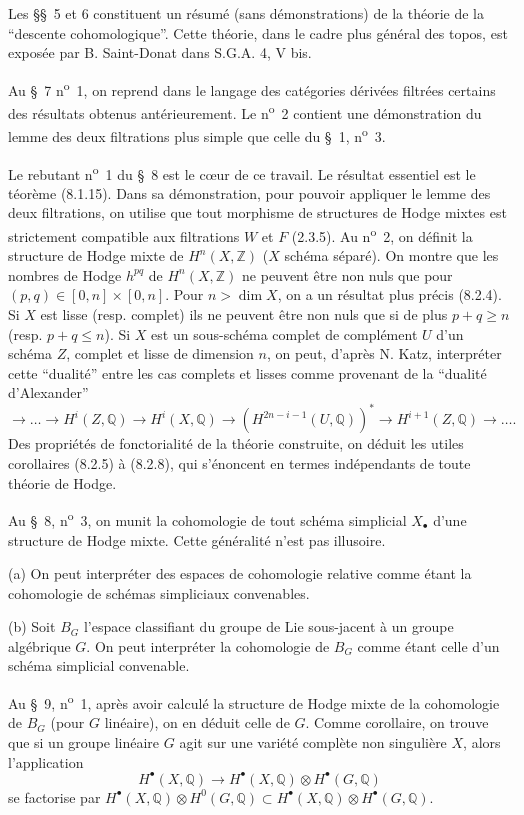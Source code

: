 \documentclass[11pt]{amsart}
\theoremstyle{plain}
\theoremstyle{definition}
\newcommand{\QQ}{\mathbb{Q}}
\newcommand{\ZZ}{\mathbb{Z}}
\begin{document}
Les \S\S\ 5 et 6 constituent un r\'esum\'e (sans d\'emonstrations) de la th\'eorie de la
``descente cohomologique''. Cette th\'eorie, dans le cadre plus g\'en\'eral des topos, est
expos\'ee par B. Saint-Donat dans S.G.A. 4, V bis.

Au \S\ 7 n\textsuperscript{o}\ 1, on reprend dans le langage des cat\'egories d\'eriv\'ees filtr\'ees certains
des r\'esultats obtenus ant\'erieurement. Le n\textsuperscript{o}\ 2 contient une d\'emonstration du lemme
des deux filtrations plus simple que celle du \S\ 1, n\textsuperscript{o}\ 3.

Le rebutant n\textsuperscript{o}\ 1 du \S\ 8 est le c\oe ur de ce travail. Le r\'esultat essentiel est le
t\'eor\`eme (8.1.15). Dans sa d\'emonstration, pour pouvoir appliquer le lemme des deux
filtrations, on utilise que tout morphisme de structures de Hodge mixtes est strictement
compatible aux filtrations $W$ et $F$ (2.3.5). Au n\textsuperscript{o}\ 2, on d\'efinit la structure de Hodge
mixte de $H^n(X, \ZZ)$ ($X$ sch\'ema s\'epar\'e). On montre que les nombres de Hodge $h^{pq}$ de
$H^n(X, \ZZ)$ ne peuvent \^etre non nuls que pour $(p,q) \in [0,n] \times [0,n]$. Pour $n > \dim X$,
on a un r\'esultat plus pr\'ecis (8.2.4). Si $X$ est lisse (resp. complet) ils ne peuvent \^etre
non nuls que si de plus $p+q \geq n$ (resp. $p+q \leq n$). Si $X$ est un sous-sch\'ema complet de
compl\'ement $U$ d'un sch\'ema $Z$, complet et lisse de dimension $n$, on peut, d'apr\`es N. Katz,
interpr\'eter cette ``dualit\'e'' entre les cas complets et lisses comme provenant de la
``dualit\'e d'Alexander''
\[
\to \ldots \to H^i(Z, \QQ) \to H^i(X, \QQ) \to (H^{2n-i-1}(U, \QQ))^* \to H^{i+1}(Z, \QQ) \to \ldots.
\]
Des propri\'et\'es de fonctorialit\'e de la th\'eorie construite, on d\'eduit les utiles
corollaires (8.2.5) \`a (8.2.8), qui s'\'enoncent en termes ind\'ependants de toute th\'eorie
de Hodge.

Au \S\ 8, n\textsuperscript{o}\ 3, on munit la cohomologie de tout sch\'ema simplicial $X_\bullet$ d'une structure
de Hodge mixte. Cette g\'en\'eralit\'e n'est pas illusoire.

(a) On peut interpr\'eter des espaces de cohomologie relative comme \'etant la
cohomologie de sch\'emas simpliciaux convenables.

(b) Soit $B_G$ l'espace classifiant du groupe de Lie sous-jacent \`a un groupe alg\'ebrique
$G$. On peut interpr\'eter la cohomologie de $B_G$ comme \'etant celle d'un sch\'ema
simplicial convenable.

Au \S\ 9, n\textsuperscript{o}\ 1, apr\`es avoir calcul\'e la structure de Hodge mixte de la cohomologie
de $B_G$ (pour $G$ lin\'eaire), on en d\'eduit celle de $G$. Comme corollaire, on trouve que si
un groupe lin\'eaire $G$ agit sur une vari\'et\'e compl\`ete non singuli\`ere $X$, alors l'application
\[
H^\bullet(X, \QQ) \to H^\bullet(X, \QQ) \otimes H^\bullet(G, \QQ)
\]
se factorise par $H^\bullet(X, \QQ) \otimes H^0(G, \QQ) \subset H^\bullet(X, \QQ) \otimes H^\bullet(G, \QQ)$.
\end{document}
